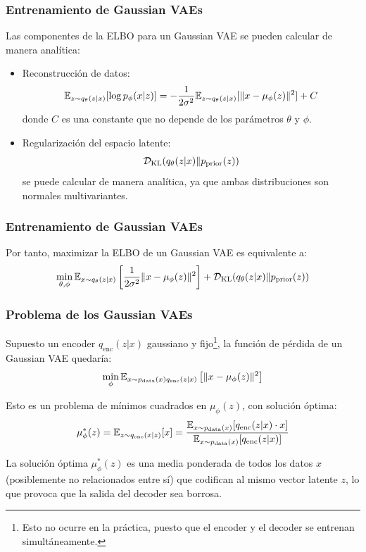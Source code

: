 \documentclass{beamer}
\begin{document}
\begin{frame}
    \frametitle{Entrenamiento de Gaussian VAEs}

    Las componentes de la ELBO para un Gaussian VAE se pueden calcular de manera analítica:
    \begin{itemize}
        \item Reconstrucción de datos:
        \begin{equation*}
            \mathbb{E}_{z\sim q_\theta(z|x)}[\log p_\phi(x|z)] = -\frac{1}{2\sigma^2}\mathbb{E}_{z\sim q_\theta(z|x)}[\|x - \mu_\phi(z)\|^2] + C
        \end{equation*}
        donde $C$ es una constante que no depende de los parámetros $\theta$ y $\phi$.\pause
        \item Regularización del espacio latente:
        \begin{equation*}
            \mathcal{D}_{\text{KL}}(q_\theta(z|x)\| p_{\text{prior}}(z))
        \end{equation*}
        se puede calcular de manera analítica, ya que ambas distribuciones son normales multivariantes.
    \end{itemize}
\end{frame}

\begin{frame}
    \frametitle{Entrenamiento de Gaussian VAEs}

    Por tanto, maximizar la ELBO de un Gaussian VAE es equivalente a:
    \begin{equation*}
        \min_{\theta, \phi} \mathbb{E}_{x\sim q_\theta(z|x)}\left[\dfrac{1}{2\sigma^2}\|x - \mu_\phi(z)\|^2\right] + \mathcal{D}_{\text{KL}}(q_\theta(z|x)\| p_{\text{prior}}(z))
    \end{equation*}
\end{frame}

\begin{frame}
    \frametitle{Problema de los Gaussian VAEs}

    Supuesto un encoder $q_{\text{enc}}(z|x)$ gaussiano y \alert{fijo\footnote{Esto no ocurre en la práctica, puesto que el encoder y el decoder se entrenan simultáneamente.}}, la función de pérdida de un Gaussian VAE quedaría:
    \begin{equation*}
        \min_{\phi} \mathbb{E}_{x\sim p_{\text{data}}(x)q_{\text{enc}}(z|x)}\left[\|x - \mu_\phi(z)\|^2\right]
    \end{equation*}\pause

    Esto es un problema de mínimos cuadrados en $\mu_\phi(z)$, con solución óptima:
    \begin{equation*}
        \mu_\phi^*(z) = \mathbb{E}_{z\sim q_{\text{enc}}(x|z)}[x] = \dfrac{\mathbb{E}_{x\sim p_{\text{data}}(x)}[q_{\text{enc}}(z|x)\cdot x]}{\mathbb{E}_{x\sim p_{\text{data}}(x)}[q_{\text{enc}}(z|x)]}
    \end{equation*}

    \pause

    La solución óptima $\mu_\phi^*(z)$ es una media ponderada de todos los datos $x$ (posiblemente no relacionados entre sí) que codifican al mismo vector latente $z$, lo que provoca que la salida del decoder sea borrosa.
\end{frame}
\end{document}
